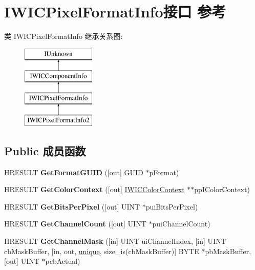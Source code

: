 \hypertarget{interface_i_w_i_c_pixel_format_info}{}\section{I\+W\+I\+C\+Pixel\+Format\+Info接口 参考}
\label{interface_i_w_i_c_pixel_format_info}
类 I\+W\+I\+C\+Pixel\+Format\+Info 继承关系图\+:\begin{figure}[H]
\begin{center}
\leavevmode
\includegraphics[height=4.000000cm]{interface_i_w_i_c_pixel_format_info}
\end{center}
\end{figure}
\subsection*{Public 成员函数}
\begin{DoxyCompactItemize}
\item 
\mbox{\label{interface_i_w_i_c_pixel_format_info_a3494f6b7e5a999a64a7f3340619c8b3b}} 
H\+R\+E\+S\+U\+LT {\bfseries Get\+Format\+G\+U\+ID} (\mbox{[}out\mbox{]} \hyperlink{interface_g_u_i_d}{G\+U\+ID} $\ast$p\+Format)
\item 
\mbox{\label{interface_i_w_i_c_pixel_format_info_a16eaf8fdd861fc105c0f38c4c2dd809c}} 
H\+R\+E\+S\+U\+LT {\bfseries Get\+Color\+Context} (\mbox{[}out\mbox{]} \hyperlink{interface_i_w_i_c_color_context}{I\+W\+I\+C\+Color\+Context} $\ast$$\ast$pp\+I\+Color\+Context)
\item 
\mbox{\label{interface_i_w_i_c_pixel_format_info_ad4b988253c1f86549df97b843d18bfbb}} 
H\+R\+E\+S\+U\+LT {\bfseries Get\+Bits\+Per\+Pixel} (\mbox{[}out\mbox{]} U\+I\+NT $\ast$pui\+Bits\+Per\+Pixel)
\item 
\mbox{\label{interface_i_w_i_c_pixel_format_info_a9e44ac23b8ee693b1fc089d34c74f839}} 
H\+R\+E\+S\+U\+LT {\bfseries Get\+Channel\+Count} (\mbox{[}out\mbox{]} U\+I\+NT $\ast$pui\+Channel\+Count)
\item 
\mbox{\label{interface_i_w_i_c_pixel_format_info_afdf62634c1f105fb26f0451d59cd8074}} 
H\+R\+E\+S\+U\+LT {\bfseries Get\+Channel\+Mask} (\mbox{[}in\mbox{]} U\+I\+NT ui\+Channel\+Index, \mbox{[}in\mbox{]} U\+I\+NT cb\+Mask\+Buffer, \mbox{[}in, out, \hyperlink{interfaceunique}{unique}, size\+\_\+is(cb\+Mask\+Buffer)\mbox{]} B\+Y\+TE $\ast$pb\+Mask\+Buffer, \mbox{[}out\mbox{]} U\+I\+NT $\ast$pcb\+Actual)
\end{DoxyCompactItemize}
